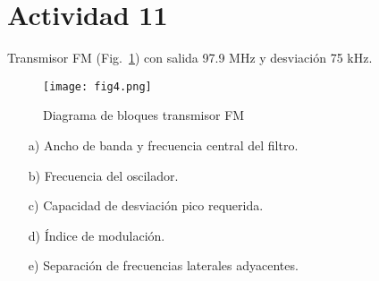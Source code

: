 \section{Actividad 11}

Transmisor FM (Fig.~\ref{fig:4}) con salida 97.9 MHz y desviación 75 kHz.  

\begin{figure}[h!]
    \centering
    \texttt{[image: fig4.png]}
    \caption{Diagrama de bloques transmisor FM}
    \label{fig:4}
\end{figure}

\begin{itemize}
    \item[a)] Ancho de banda y frecuencia central del filtro.  
    \item[b)] Frecuencia del oscilador.  
    \item[c)] Capacidad de desviación pico requerida.  
    \item[d)] Índice de modulación.  
    \item[e)] Separación de frecuencias laterales adyacentes.  
\end{itemize}